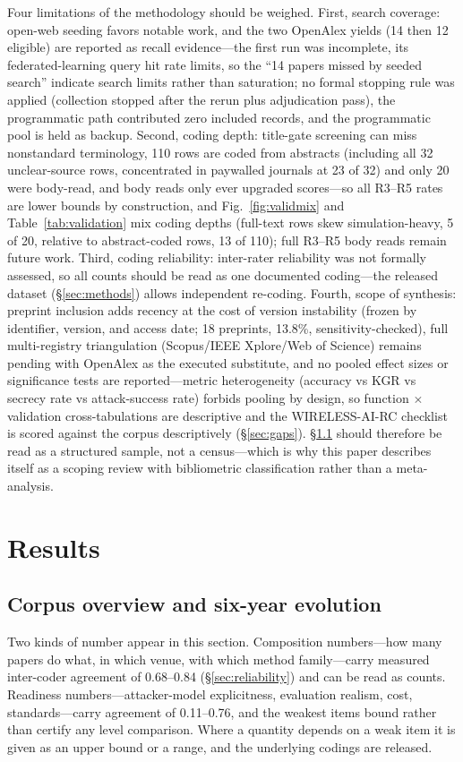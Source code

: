 Four limitations of the methodology should be weighed. First, search coverage: open-web seeding favors notable work, and the two OpenAlex yields (14 then 12 eligible) are reported as recall evidence---the first run was incomplete, its federated-learning query hit rate limits, so the ``14 papers missed by seeded search'' indicate search limits rather than saturation; no formal stopping rule was applied (collection stopped after the rerun plus adjudication pass), the programmatic path contributed zero included records, and the programmatic pool is held as backup. Second, coding depth: title-gate screening can miss nonstandard terminology, 110 rows are coded from abstracts (including all 32 unclear-source rows, concentrated in paywalled journals at 23 of 32) and only 20 were body-read, and body reads only ever upgraded scores---so all R3--R5 rates are lower bounds by construction, and Fig.~\ref{fig:validmix} and Table~\ref{tab:validation} mix coding depths (full-text rows skew simulation-heavy, 5 of 20, relative to abstract-coded rows, 13 of 110); full R3--R5 body reads remain future work. Third, coding reliability: inter-rater reliability was not formally assessed, so all counts should be read as one documented coding---the released dataset (\S\ref{sec:methods}) allows independent re-coding. Fourth, scope of synthesis: preprint inclusion adds recency at the cost of version instability (frozen by identifier, version, and access date; 18 preprints, 13.8\%, sensitivity-checked), full multi-registry triangulation (Scopus/IEEE Xplore/Web of Science) remains pending with OpenAlex as the executed substitute, and no pooled effect sizes or significance tests are reported---metric heterogeneity (accuracy vs KGR vs secrecy rate vs attack-success rate) forbids pooling by design, so function $\times$ validation cross-tabulations are descriptive and the WIRELESS-AI-RC checklist is scored against the corpus descriptively (\S\ref{sec:gaps}). \S\ref{sec:corpus} should therefore be read as a structured sample, not a census---which is why this paper describes itself as a scoping review with bibliometric classification rather than a meta-analysis.

\section{Results}
\subsection{Corpus overview and six-year evolution}
\label{sec:corpus}
Two kinds of number appear in this section. Composition numbers---how many papers do
what, in which venue, with which method family---carry measured inter-coder agreement of
0.68--0.84 (\S\ref{sec:reliability}) and can be read as counts. Readiness numbers---attacker-model
explicitness, evaluation realism, cost, standards---carry agreement of 0.11--0.76, and the
weakest items bound rather than certify any level comparison. Where a quantity depends on a weak
item it is given as an upper bound or a range, and the underlying codings are released.
